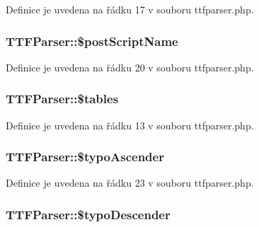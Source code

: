 Definice je uvedena na řádku 17 v souboru ttfparser.\-php.

\hypertarget{class_t_t_f_parser_ac67943b8655cae5c6ba81e7217abc04f}{
\subsubsection[{\$post\-Script\-Name}]{\setlength{\rightskip}{0pt plus 5cm}T\-T\-F\-Parser\-::\$post\-Script\-Name}}\label{class_t_t_f_parser_ac67943b8655cae5c6ba81e7217abc04f}


Definice je uvedena na řádku 20 v souboru ttfparser.\-php.

\hypertarget{class_t_t_f_parser_a6fec21b0a0305f020012e2382f96005f}{
\subsubsection[{\$tables}]{\setlength{\rightskip}{0pt plus 5cm}T\-T\-F\-Parser\-::\$tables}}\label{class_t_t_f_parser_a6fec21b0a0305f020012e2382f96005f}


Definice je uvedena na řádku 13 v souboru ttfparser.\-php.

\hypertarget{class_t_t_f_parser_a2e6d7caa84b7c678d3c475f71ec81528}{
\subsubsection[{\$typo\-Ascender}]{\setlength{\rightskip}{0pt plus 5cm}T\-T\-F\-Parser\-::\$typo\-Ascender}}\label{class_t_t_f_parser_a2e6d7caa84b7c678d3c475f71ec81528}


Definice je uvedena na řádku 23 v souboru ttfparser.\-php.

\hypertarget{class_t_t_f_parser_a7f2b6f4e0e71e6284255c46beb24586d}{
\subsubsection[{\$typo\-Descender}]{\setlength{\rightskip}{0pt plus 5cm}T\-T\-F\-Parser\-::\$typo\-Descender}}\label{class_t_t_f_parser_a7f2b6f4e0e71e6284255c46beb24586d}


